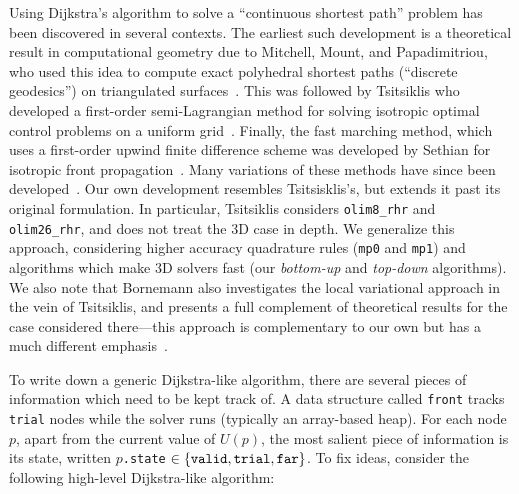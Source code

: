 \documentclass[smallcondensed]{svjour3}
\begin{document}
Using Dijkstra's algorithm to solve a ``continuous shortest path''
problem has been discovered in several contexts. The earliest such
development is a theoretical result in computational geometry due to
Mitchell, Mount, and Papadimitriou, who used this idea to compute
exact polyhedral shortest paths (``discrete geodesics'') on
triangulated surfaces~\cite{mitchell1987discrete}. This was followed
by Tsitsiklis who developed a first-order semi-Lagrangian method for
solving isotropic optimal control problems on a uniform
grid~\cite{tsitsiklis1995efficient}. Finally, the fast marching
method, which uses a first-order upwind finite difference scheme was
developed by Sethian for isotropic front
propagation~\cite{sethian1996fast}. Many variations of these methods
have since been
developed~\cite{sethian2003ordered,kao2008legendre}. Our own
development resembles Tsitsisklis's, but extends it past its original
formulation. In particular, Tsitsiklis considers \texttt{olim8\_rhr}
and \texttt{olim26\_rhr}, and does not treat the 3D case in depth. We
generalize this approach, considering higher accuracy quadrature rules
(\texttt{mp0} and \texttt{mp1}) and algorithms which make 3D solvers
fast (our \emph{bottom-up} and \emph{top-down} algorithms). We also
note that Bornemann also investigates the local variational approach
in the vein of Tsitsiklis, and presents a full complement of
theoretical results for the case considered there---this approach is
complementary to our own but has a much different
emphasis~\cite{bornemann2006finite}.

To write down a generic Dijkstra-like algorithm, there are several
pieces of information which need to be kept track of. A data structure
called \texttt{front} tracks \texttt{trial} nodes while the solver
runs (typically an array-based heap). For each node $p$, apart from
the current value of $U(p)$, the most salient piece of information is
its state, written $p$\texttt{.state}
$\in \left\{\texttt{valid}, \texttt{trial}, \texttt{far}\right\}$. To fix
ideas, consider the following high-level Dijkstra-like algorithm:
\end{document}
